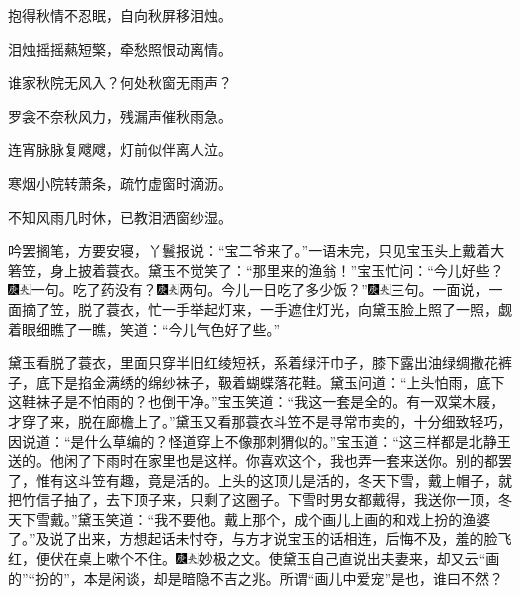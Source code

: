 抱得秋情不忍眠，自向秋屏移泪烛。

泪烛摇摇爇短檠，牵愁照恨动离情。

谁家秋院无风入？何处秋窗无雨声？

罗衾不奈秋风力，残漏声催秋雨急。

连宵脉脉复飕飕，灯前似伴离人泣。

寒烟小院转萧条，疏竹虚窗时滴沥。

不知风雨几时休，已教泪洒窗纱湿。

吟罢搁笔，方要安寝，丫鬟报说：“宝二爷来了。”一语未完，只见宝玉头上戴着大箬笠，身上披着蓑衣。黛玉不觉笑了：“那里来的渔翁！”宝玉忙问：“今儿好些？{\includegraphics[width=3mm]{../Images/00004}\includegraphics[width=3mm]{../Images/00012}\footnotesize \kaishu 一句。}吃了药没有？{\includegraphics[width=3mm]{../Images/00004}\includegraphics[width=3mm]{../Images/00012}\footnotesize \kaishu 两句。}今儿一日吃了多少饭？”{\includegraphics[width=3mm]{../Images/00004}\includegraphics[width=3mm]{../Images/00012}\footnotesize \kaishu 三句。}一面说，一面摘了笠，脱了蓑衣，忙一手举起灯来，一手遮住灯光，向黛玉脸上照了一照，觑着眼细瞧了一瞧，笑道：“今儿气色好了些。”

黛玉看脱了蓑衣，里面只穿半旧红绫短袄，系着绿汗巾子，膝下露出油绿绸撒花裤子，底下是掐金满绣的绵纱袜子，靸着蝴蝶落花鞋。黛玉问道：“上头怕雨，底下这鞋袜子是不怕雨的？也倒干净。”宝玉笑道：“我这一套是全的。有一双棠木屐，才穿了来，脱在廊檐上了。”黛玉又看那蓑衣斗笠不是寻常市卖的，十分细致轻巧，因说道：“是什么草编的？怪道穿上不像那刺猬似的。”宝玉道：“这三样都是北静王送的。他闲了下雨时在家里也是这样。你喜欢这个，我也弄一套来送你。别的都罢了，惟有这斗笠有趣，竟是活的。上头的这顶儿是活的，冬天下雪，戴上帽子，就把竹信子抽了，去下顶子来，只剩了这圈子。下雪时男女都戴得，我送你一顶，冬天下雪戴。”黛玉笑道：“我不要他。戴上那个，成个画儿上画的和戏上扮的渔婆了。”及说了出来，方想起话未忖夺，与方才说宝玉的话相连，后悔不及，羞的脸飞红，便伏在桌上嗽个不住。{\includegraphics[width=3mm]{../Images/00004}\includegraphics[width=3mm]{../Images/00012}\footnotesize \kaishu 妙极之文。使黛玉自己直说出夫妻来，却又云“画的”“扮的”，本是闲谈，却是暗隐不吉之兆。所谓“画儿中爱宠”是也，谁曰不然？}

